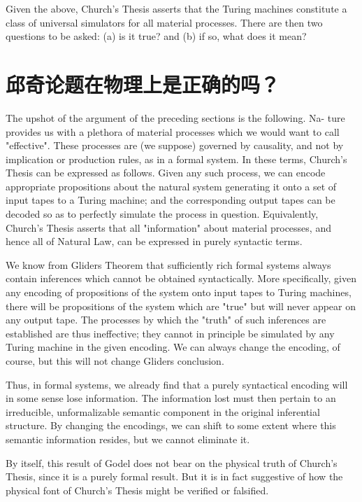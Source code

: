 \documentclass[a4paper,12pt]{article}
\begin{document}
Given the above, Church's Thesis asserts that the Turing machines constitute
a class of universal simulators for all material processes. There are
then two questions to be asked: (a) is it true? and (b) if so, what does it
mean?

\section{邱奇论题在物理上是正确的吗？}

The upshot of the argument of the preceding sections is the following. Na-
ture provides us with a plethora of material processes which we would want
to call "effective". These processes are (we suppose) governed by causality,
and not by implication or production rules, as in a formal system. In these
terms, Church's Thesis can be expressed as follows. Given any such process,
we can encode appropriate propositions about the natural system generating
it onto a set of input tapes to a Turing machine; and the corresponding output
tapes can be decoded so as to perfectly simulate the process in question.
Equivalently, Church's Thesis asserts that all "information" about material
processes, and hence all of Natural Law, can be expressed in purely syntactic
terms.

We know from Gliders Theorem that sufficiently rich formal systems
always contain inferences which cannot be obtained syntactically.  More
specifically, given any encoding of propositions of the system onto input
tapes to Turing machines, there will be propositions of the system which are
"true" but will never appear on any output tape. The processes by which the
"truth" of such inferences are established are thus ineffective; they cannot
in principle be simulated by any Turing machine in the given encoding. We
can always change the encoding, of course, but this will not change Gliders
conclusion.

Thus, in formal systems, we already find that a purely syntactical encoding
will in some sense lose information. The information lost must then
pertain to an irreducible, unformalizable semantic component in the original
inferential structure. By changing the encodings, we can shift to some
extent where this semantic information resides, but we cannot eliminate it.

By itself, this result of Godel does not bear on the physical truth of
Church's Thesis, since it is a purely formal result. But it is in fact suggestive
of how the physical font of Church's Thesis might be verified or falsified.
\end{document}
